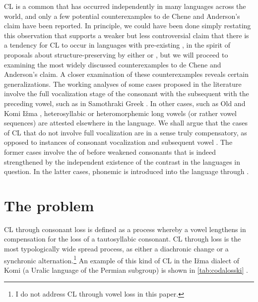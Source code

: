 \documentclass[output=paper,
modfonts
]{LSP/langsci}
\begin{document}
CL is a common  that has occurred
independently in many languages across the world, and only a few potential
counterexamples to de Chene and Anderson's claim have been reported. In
principle, we could have been done simply restating this observation
that supports a weaker but less controversial claim that there is a
tendency for CL to occur in languages with
pre-existing , in the spirit of proposals about
structure-preserving  by either \citet{kiparsky2003} or \citet{blevins2009k}, but we will proceed to examining the most widely discussed
counterexamples to de Chene and Anderson's claim. A closer examination
of these counterexamples reveals certain generalizations. The working
analyses of some cases proposed in the literature involve the full
vocalization stage of the consonant with the subsequent  with
the preceding vowel, such as in Samothraki Greek \citep{sumner1999,kiparsky2011k}. In other cases, such as Old  \citep{gess1998} and Komi Ižma
\citep{hausenberg1998}, heterosyllabic or heteromorphemic long vowels (or
rather vowel sequences) are attested elsewhere in the language. We shall
argue that the cases of CL that do not involve
full vocalization \citep{hayes1989k,kavitskaya2002} are in a sense truly
compensatory, as opposed to instances of consonant vocalization and
subsequent vowel . The former cases involve the  of
 before weakened consonants that is indeed strengthened by
the independent existence of the  contrast in the languages
in question. In the latter cases, phonemic  is introduced
into the language through .

\section{The problem}

CL through consonant loss is defined as a
process whereby a vowel lengthens in compensation for the loss of a
tautosyllabic consonant. CL through  loss is the most typologically
wide spread process, as either a diachronic change or a synchronic
alternation.\footnote{I do not address CL through vowel loss in this
  paper.} An example of this kind of CL in the Ižma dialect of Komi (a
Uralic language of the Permian subgroup) is shown in
\cref{tab:codalosski} \citep{harms1967,harms1968,deChene1979}.
\end{document}
